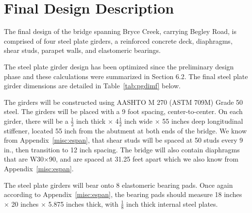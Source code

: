 \section{Final Design Description}

The final design of the bridge spanning Bryce Creek, carrying Begley Road, is comprised of four steel plate girders, a reinforced concrete deck, diaphragms, shear studs, parapet walls, and elastomeric bearings.

The steel plate girder design has been optimized since the preliminary design phase and these calculations were summarized in Section 6.2. The final steel plate girder dimensions are detailed in Table~\ref{tab:pgdimf} below.

\begin{table}[H]
\centering
\caption{Plate Girder Components Dimensions}\label{tab:pgdimf}
\vspace{0.5cm}
\end{table}

The girders will be constructed using AASHTO M 270 (ASTM 709M) Grade 50 steel. The girders will be placed with a 9 foot spacing, center-to-center. On each girder, there will be a \(\frac{1}{2}\) inch thick \(\times\) 4\(\frac{1}{2}\) inch wide \(\times\) 55 inches deep longitudinal stiffener, located 55 inch from the abutment at both ends of the bridge. We know from Appendix~\ref{misc:espan}, that shear studs will be spaced at 50 studs every 9 in., then transition to 12 inch spacing. The bridge will also contain diaphragms that are W30\(\times\)90, and are spaced at 31.25 feet apart which we also know from Appendix~\ref{misc:espan}.

The steel plate girders will bear onto 8 elastomeric bearing pads. Once again according to Appendix~\ref{misc:espan}, the bearing pads should measure 18 inches \(\times\) 20 inches \(\times\) 5.875 inches thick, with \(\frac{1}{8}\) inch thick internal steel plates.


